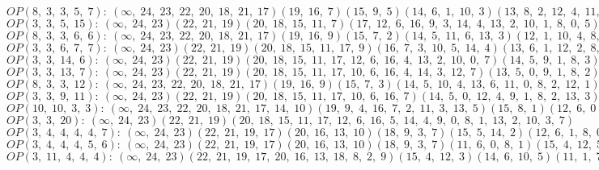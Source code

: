 $OP(8, \;3, \;3, \;5, \;7): \:(\infty, \;24, \;23, \;22, \;20, \;18, \;21, \;17)(19, \;16, \;7)(15, \;9, \;5)(14, \;6, \;1, \;10, \;3)(13, \;8, \;2, \;12, \;4, \;11, \;0)$\\
$OP(3, \;3, \;5, \;15): \:(\infty, \;24, \;23)(22, \;21, \;19)(20, \;18, \;15, \;11, \;7)(17, \;12, \;6, \;16, \;9, \;3, \;14, \;4, \;13, \;2, \;10, \;1, \;8, \;0, \;5)$\\
$OP(8, \;3, \;3, \;6, \;6): \:(\infty, \;24, \;23, \;22, \;20, \;18, \;21, \;17)(19, \;16, \;9)(15, \;7, \;2)(14, \;5, \;11, \;6, \;13, \;3)(12, \;1, \;10, \;4, \;8, \;0)$\\
$OP(3, \;3, \;6, \;7, \;7): \:(\infty, \;24, \;23)(22, \;21, \;19)(20, \;18, \;15, \;11, \;17, \;9)(16, \;7, \;3, \;10, \;5, \;14, \;4)(13, \;6, \;1, \;12, \;2, \;8, \;0)$\\
$OP(3, \;3, \;14, \;6): \:(\infty, \;24, \;23)(22, \;21, \;19)(20, \;18, \;15, \;11, \;17, \;12, \;6, \;16, \;4, \;13, \;2, \;10, \;0, \;7)(14, \;5, \;9, \;1, \;8, \;3)$\\
$OP(3, \;3, \;13, \;7): \:(\infty, \;24, \;23)(22, \;21, \;19)(20, \;18, \;15, \;11, \;17, \;10, \;6, \;16, \;4, \;14, \;3, \;12, \;7)(13, \;5, \;0, \;9, \;1, \;8, \;2)$\\
$OP(8, \;3, \;3, \;12): \:(\infty, \;24, \;23, \;22, \;20, \;18, \;21, \;17)(19, \;16, \;9)(15, \;7, \;3)(14, \;5, \;10, \;4, \;13, \;6, \;11, \;0, \;8, \;2, \;12, \;1)$\\
$OP(3, \;3, \;9, \;11): \:(\infty, \;24, \;23)(22, \;21, \;19)(20, \;18, \;15, \;11, \;17, \;10, \;6, \;16, \;7)(14, \;5, \;0, \;12, \;4, \;9, \;1, \;8, \;2, \;13, \;3)$\\
$OP(10, \;10, \;3, \;3): \:(\infty, \;24, \;23, \;22, \;20, \;18, \;21, \;17, \;14, \;10)(19, \;9, \;4, \;16, \;7, \;2, \;11, \;3, \;13, \;5)(15, \;8, \;1)(12, \;6, \;0)$\\
$OP(3, \;3, \;20): \:(\infty, \;24, \;23)(22, \;21, \;19)(20, \;18, \;15, \;11, \;17, \;12, \;6, \;16, \;5, \;14, \;4, \;9, \;0, \;8, \;1, \;13, \;2, \;10, \;3, \;7)$\\
$OP(3, \;4, \;4, \;4, \;4, \;7): \:(\infty, \;24, \;23)(22, \;21, \;19, \;17)(20, \;16, \;13, \;10)(18, \;9, \;3, \;7)(15, \;5, \;14, \;2)(12, \;6, \;1, \;8, \;0, \;11, \;4)$\\
$OP(3, \;4, \;4, \;4, \;5, \;6): \:(\infty, \;24, \;23)(22, \;21, \;19, \;17)(20, \;16, \;13, \;10)(18, \;9, \;3, \;7)(11, \;6, \;0, \;8, \;1)(15, \;4, \;12, \;5, \;14, \;2)$\\
$OP(3, \;11, \;4, \;4, \;4): \:(\infty, \;24, \;23)(22, \;21, \;19, \;17, \;20, \;16, \;13, \;18, \;8, \;2, \;9)(15, \;4, \;12, \;3)(14, \;6, \;10, \;5)(11, \;1, \;7, \;0)$\\
